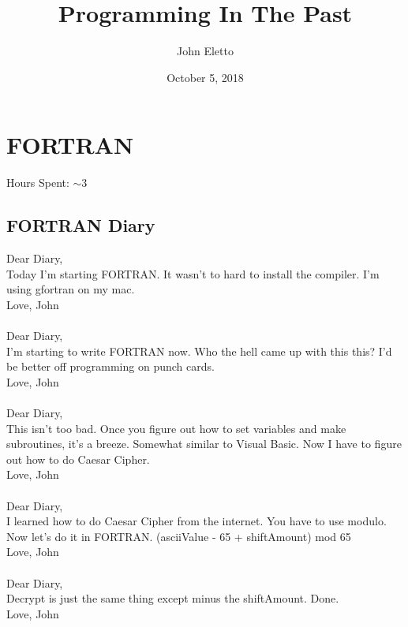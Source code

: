 \documentclass{article}
\title{Programming In The Past}
\author{John Eletto}
\date{October 5, 2018}
\begin{document}
\maketitle
\section*{FORTRAN}
Hours Spent: $\sim$3
\subsection*{FORTRAN Diary}
Dear Diary,
\\
Today I'm starting FORTRAN. It wasn't to hard to install the compiler. I'm using gfortran on my mac.
\\
Love, John
\\
\\
Dear Diary,
\\
I'm starting to write FORTRAN now. Who the hell came up with this this? I'd be better off programming on punch cards.
\\
Love, John
\\
\\
Dear Diary,
\\
This isn't too bad. Once you figure out how to set variables and make subroutines, it's a breeze. Somewhat similar to Visual Basic. Now I have to figure out how to do Caesar Cipher.
\\
Love, John
\\
\\
Dear Diary,
\\
I learned how to do Caesar Cipher from the internet. You have to use modulo. Now let's do it in FORTRAN. (asciiValue - 65 + shiftAmount) mod 65
\\
Love, John
\\
\\
Dear Diary,
\\
Decrypt is just the same thing except minus the shiftAmount. Done.
\\
Love, John
\end{document}

